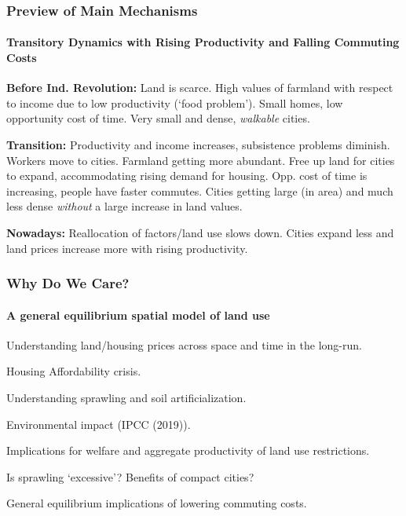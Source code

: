 \documentclass[aspectratio=169]{beamer}
\begin{document}
\begin{v75mins}
\begin{frame}
\frametitle{Preview of Main Mechanisms}
\framesubtitle{Transitory Dynamics with Rising Productivity and Falling Commuting Costs}

\begin{widei}
\item<1-> \textbf{Before Ind. Revolution:} Land is scarce. High values of farmland with respect to income due to low productivity (`food problem'). Small homes, low opportunity cost of time. Very small and dense, \emph{walkable} cities.
\item<2-> \textbf{Transition:} Productivity and income increases, subsistence problems diminish. Workers move to cities. Farmland getting more abundant. Free up land for cities to expand, accommodating rising demand for housing. Opp. cost of time is increasing, people have faster commutes. Cities getting large (in area) and much less dense \emph{without} a large increase in land values.
\item<3-> \textbf{Nowadays:} Reallocation of factors/land use slows down. Cities expand less and land prices increase more with rising productivity.
\end{widei}
\end{frame}
\end{v75mins}


\begin{frame}
	\frametitle{Why Do We Care?}
\framesubtitle{A general equilibrium spatial model of land use}
\bi
\item Understanding land/housing prices across space and time in the long-run.
\bi
\item Housing Affordability crisis.
\ei
\bigskip
\item Understanding sprawling and soil artificialization.
\bi
\item Environmental impact (IPCC (2019)).
\ei
\bigskip
\item Implications for welfare and aggregate productivity of land use restrictions.  %
\bi
\item Is sprawling `excessive'? Benefits of compact cities?
\item General equilibrium implications of lowering commuting costs.
\ei
\ei
\end{frame}
\end{document}

